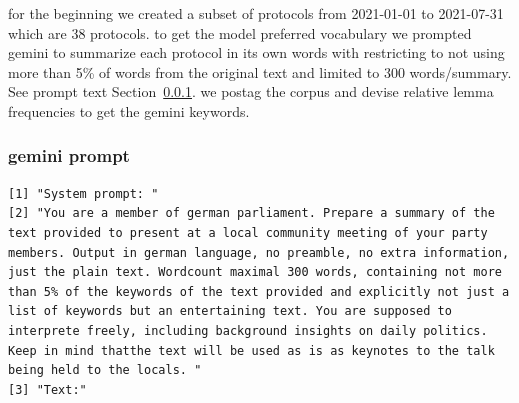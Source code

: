 \documentclass[
  letterpaper,
  DIV=11,
  numbers=noendperiod]{scrartcl}
\begin{document}
for the beginning we created a subset of protocols from 2021-01-01 to
2021-07-31 which are 38 protocols. to get the model preferred vocabulary
we prompted gemini to summarize each protocol in its own words with
restricting to not using more than 5\% of words from the original text
and limited to 300 words/summary. See prompt text
Section~\ref{sec-gemini-prompt}. we postag the corpus and devise
relative lemma frequencies to get the gemini keywords.

\subsubsection{gemini prompt}\label{sec-gemini-prompt}

\begin{verbatim}
[1] "System prompt: "                                                                                                                                                                                                                                                                                                                                                                                                                                                                                                                                                                           
[2] "You are a member of german parliament. Prepare a summary of the text provided to present at a local community meeting of your party members. Output in german language, no preamble, no extra information, just the plain text. Wordcount maximal 300 words, containing not more than 5% of the keywords of the text provided and explicitly not just a list of keywords but an entertaining text. You are supposed to interprete freely, including background insights on daily politics. Keep in mind thatthe text will be used as is as keynotes to the talk being held to the locals. "
[3] "Text:"                                                                                                                                                                                                                                                                                                                                                                                                                                                                                                                                                                                     
\end{verbatim}
\end{document}
